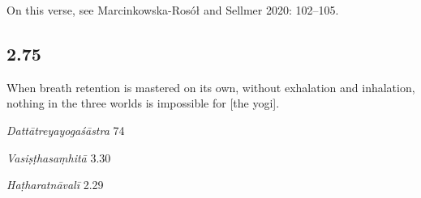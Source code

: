 \begin{ekdosis}
\begin{testimonia}[hp02_074]

\end{testimonia}

\begin{philcomm}[hp02_074]
On this verse, see Marcinkowska-Rosół and Sellmer 2020: 102–105.
\end{philcomm}

\subsection*{2.75}
\begin{translation}[hp02_075]
When breath retention is mastered on its own, without exhalation and inhalation, nothing in the three worlds is impossible for [the yogi].
\end{translation}


\begin{sources}[hp02_075]
\emph{Dattātreyayogaśāstra} 74

\begin{versinnote}
\end{versinnote}

\emph{Vasiṣṭhasaṃhitā} 3.30

\begin{versinnote}
\end{versinnote}
\end{sources}

\begin{testimonia}[hp02_075]
\emph{Haṭharatnāvalī} 2.29


\end{testimonia}
\end{ekdosis}
